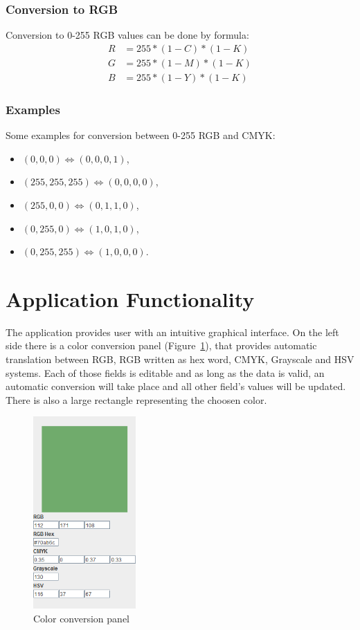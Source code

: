 \documentclass[titlepage]{article}
\begin{document}
\subsubsection{Conversion to RGB}
Conversion to 0-255 RGB values can be done by formula:
\begin{equation}
\begin{split}
R&=255*(1-C)*(1-K)\\
G&=255*(1-M)*(1-K)\\
B&=255*(1-Y)*(1-K)
\end{split}
\end{equation}

\subsubsection{Examples}
Some examples for conversion between 0-255 RGB and CMYK:
\begin{itemize}
  \item $(0, 0, 0) \Leftrightarrow (0, 0, 0, 1)$,
  \item $(255, 255, 255) \Leftrightarrow (0, 0, 0, 0)$,
  \item $(255, 0, 0) \Leftrightarrow (0, 1, 1, 0)$,
  \item $(0, 255, 0) \Leftrightarrow (1, 0, 1, 0)$,
  \item $(0, 255, 255) \Leftrightarrow (1, 0, 0, 0)$.
\end{itemize}

\clearpage
\section{Application Functionality}
The application provides user with an intuitive graphical interface. On the left side there is a color conversion panel (Figure~\ref{fig:conv}), that provides automatic translation between RGB, RGB written as hex word, CMYK, Grayscale and HSV systems. Each of those fields is editable and as long as the data is valid, an automatic conversion will take place and all other field's values will be updated. There is also a large rectangle representing the choosen color.

\begin{figure}[!htb]
	\centering
	\includegraphics[width=0.35\textwidth]{img/conversion.png} 
	\caption{Color conversion panel}
	\label{fig:conv}
\end{figure}
\end{document}
